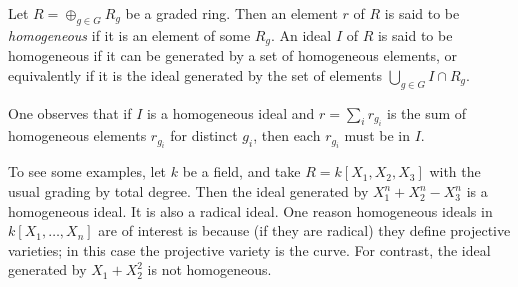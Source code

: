 \documentclass[12pt]{article}
\begin{document}
Let $R = \oplus_{g\in G} R_g$ be a graded ring.  Then an element $r$ of $R$ is said to be \emph{homogeneous} if it is an element of some $R_g$.  An ideal $I$ of $R$ is said to be homogeneous if it can be generated by a set of homogeneous elements, or equivalently if it is the ideal generated by the set of elements $\bigcup_{g\in G} I\cap R_g$.

One observes that if $I$ is a homogeneous ideal and $r=\sum_i r_{g_i}$ is the sum of homogeneous elements $r_{g_i}$ for distinct $g_i$, then each $r_{g_i}$ must be in $I$. 

To see some examples, let $k$ be a field, and take $R=k[X_1,X_2,X_3]$ with the usual grading by total degree.  Then the ideal generated by $X_1^n+X_2^n-X_3^n$ is a homogeneous ideal.  It is also a radical ideal.  One reason homogeneous ideals in $k[X_1,\ldots,X_n]$ are of interest is because (if they are radical) they define projective varieties; in this case the projective variety is the  curve.  For contrast, the ideal generated by $X_1+X_2^2$ is not homogeneous.
\end{document}
